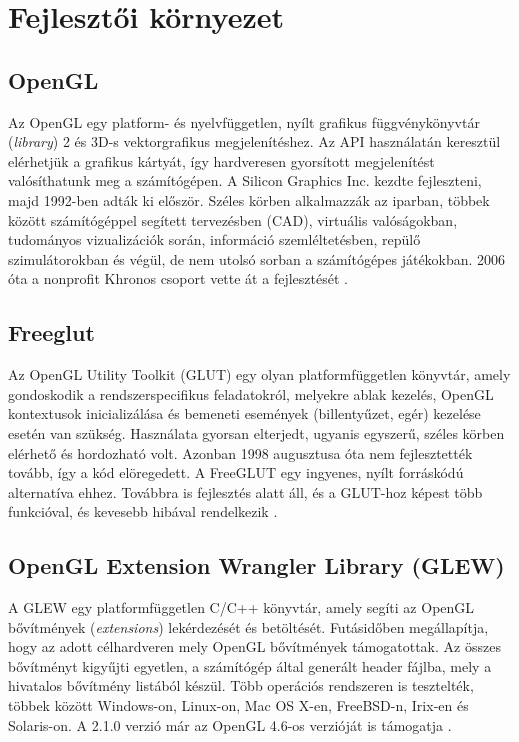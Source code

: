 

\section{Fejlesztői környezet}

\subsection{OpenGL}


Az OpenGL egy platform- és nyelvfüggetlen, nyílt grafikus függvénykönyvtár (\textit{library}) 2 és 3D-s vektorgrafikus megjelenítéshez. Az API használatán keresztül elérhetjük a grafikus kártyát, így hardveresen gyorsított megjelenítést valósíthatunk meg a számítógépen. A Silicon Graphics Inc. kezdte fejleszteni, majd 1992-ben adták ki először. Széles körben alkalmazzák az iparban, többek között számítógéppel segített tervezésben (CAD), virtuális valóságokban, tudományos vizualizációk során, információ szemléltetésben, repülő szimulátorokban és végül, de nem utolsó sorban a számítógépes játékokban. 2006 óta a nonprofit Khronos csoport vette át a fejlesztését \cite{wikiOGL}.

\subsection{Freeglut}

Az OpenGL Utility Toolkit (GLUT) egy olyan platformfüggetlen könyvtár, amely gondoskodik a rendszerspecifikus feladatokról, melyekre ablak kezelés, OpenGL kontextusok inicializálása és bemeneti események (billentyűzet, egér) kezelése esetén van szükség. Használata gyorsan elterjedt, ugyanis egyszerű, széles körben elérhető és hordozható volt. Azonban 1998 augusztusa óta nem fejlesztették tovább, így a kód elöregedett. A FreeGLUT egy ingyenes, nyílt forráskódú alternatíva ehhez. Továbbra is fejlesztés alatt áll, és a GLUT-hoz képest több funkcióval, és kevesebb hibával rendelkezik \cite{freeGlut}.

\subsection{OpenGL Extension Wrangler Library (GLEW)}

A GLEW egy platformfüggetlen C/C++ könyvtár, amely segíti az OpenGL bővítmények (\textit{extensions}) lekérdezését és betöltését. Futásidőben megállapítja, hogy az adott célhardveren mely OpenGL bővítmények támogatottak. Az összes bővítményt kigyűjti egyetlen, a számítógép által generált header fájlba, mely a hivatalos bővítmény listából készül. Több operációs rendszeren is tesztelték, többek között Windows-on, Linux-on, Mac OS X-en, FreeBSD-n, Irix-en és Solaris-on. A 2.1.0 verzió már az OpenGL 4.6-os verzióját is támogatja \cite{glew}.

